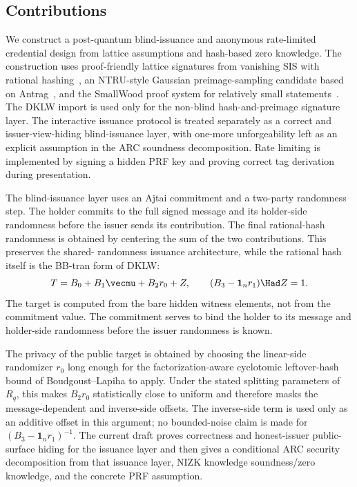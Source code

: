 \subsection{Contributions}
We construct a post-quantum blind-issuance and anonymous rate-limited credential design from lattice
assumptions and hash-based zero knowledge.  The construction uses proof-friendly lattice signatures from
vanishing SIS with rational hashing~\cite{EPRINT:DKLW25}, an NTRU-style Gaussian preimage-sampling
candidate based on Antrag~\cite{EPRINT:ENSTW23}, and the SmallWood proof system for relatively small
statements~\cite{EPRINT:FenRiv25b}.  The DKLW import is used only for the non-blind
hash-and-preimage signature layer.  The interactive issuance protocol is treated separately as a
correct and issuer-view-hiding blind-issuance layer, with one-more unforgeability left as an explicit
assumption in the ARC soundness decomposition.  Rate limiting is implemented by signing a hidden PRF
key and proving correct tag derivation during presentation.

The blind-issuance layer uses an Ajtai commitment and a two-party randomness step.  The holder commits
to the full signed message and its holder-side randomness before the issuer sends its contribution.  The final
rational-hash randomness is obtained by centering the sum of the two contributions.  This preserves the shared-
randomness issuance architecture, while the rational hash itself is the BB-tran form of DKLW:
\[
  T=B_0+B_1\vecmu+B_2r_0+Z,\qquad (B_3-\mathbf 1_n r_1)\Had Z=1.
\]
The target is computed from the bare hidden witness elements, not from the commitment value.  The commitment
serves to bind the holder to its message and holder-side randomness before the issuer randomness is known.

The privacy of the public target is obtained by choosing the linear-side randomizer $r_0$ long enough for
the factorization-aware cyclotomic leftover-hash bound of Boudgoust--Lapiha to apply.  Under the stated
splitting parameters of $R_q$, this makes $B_2r_0$ statistically close to uniform and therefore masks the
message-dependent and inverse-side offsets.  The inverse-side term is used only as an additive offset in
this argument; no bounded-noise claim is made for $(B_3-\mathbf 1_n r_1)^{-1}$.  The current draft proves correctness
and honest-issuer public-surface hiding for the issuance layer and then gives a conditional ARC security
decomposition from that issuance layer, NIZK knowledge soundness/zero knowledge, and the concrete PRF
assumption.

